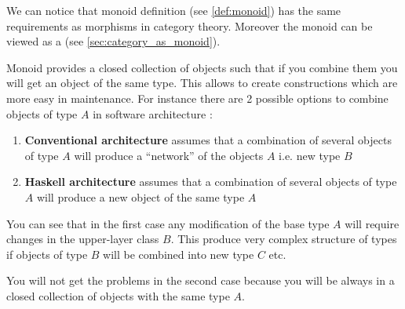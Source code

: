 We can notice that monoid definition (see \cref{def:monoid}) has the
same requirements as morphisms in category theory. Moreover the monoid
can be viewed as a  (see
\cref{sec:category_as_monoid}).  

Monoid provides a closed collection of objects such that if you
combine them you will get an object of the same type. This allows to
create constructions which are more easy in maintenance. For instance
there are 2 possible options to combine objects of type $A$ in
software architecture \cite{bib:scalable_program_arch, quora:monoidimportance}:
\begin{enumerate}
\item \textbf{Conventional architecture} assumes that a combination of
  several objects of type $A$ will produce a ``network'' of the objects
  $A$ i.e. new type $B$
\item \textbf{Haskell architecture} assumes that a combination of
  several objects of type $A$ will produce a new object of the same
  type $A$
\end{enumerate}
You can see that in the first case any modification of the base type
$A$ will require changes in the upper-layer class $B$. This produce
very complex structure of types if objects of type $B$ will be
combined into new type $C$ etc.

You will not get the problems in the second case because you will be
always in a closed collection of objects with the same type $A$.


